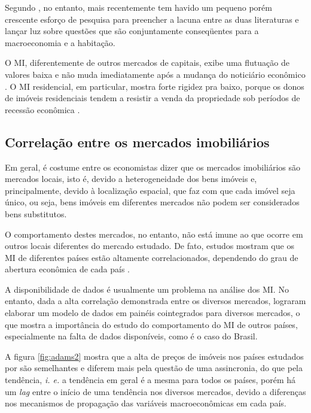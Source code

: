 \documentclass[
	12pt,				%
	oneside,			%
	a4paper,			%
	chapter=TITLE,		%
	section=TITLE,		%
	english,			%
	brazil				%
	]{abntex2}
\begin{document}
\begin{refsection}
Segundo \textcite[p.~4]{LEUNG}, no entanto, mais recentemente tem havido um pequeno porém
crescente esforço de pesquisa para preencher a lacuna entre as duas literaturas
e lançar luz sobre questões que são conjuntamente conseqüentes para a
macroeconomia e a habitação.

O \gls{MI}, diferentemente de outros mercados de capitais, exibe uma flutuação
de valores baixa e não muda imediatamente após a mudança do noticiário econômico
\autocite[3]{ADAMS2010}. O \gls{MI} residencial, em particular, mostra forte rigidez
pra baixo, porque os donos de imóveis residenciais tendem a resistir a venda da
propriedade sob períodos de recessão econômica \autocite[129]{Case2000}.

\hypertarget{correlauxe7uxe3o-entre-os-mercados-imobiliuxe1rios}{%
\subsection{Correlação entre os mercados imobiliários}\label{correlauxe7uxe3o-entre-os-mercados-imobiliuxe1rios}}

Em geral, é costume entre os economistas dizer que os mercados imobiliários são
mercados locais, isto é, devido a heterogeneidade dos bens imóveis e,
principalmente, devido à localização espacial, que faz com que cada imóvel seja
único, ou seja, bens imóveis em diferentes mercados não podem ser
considerados bens substitutos.

O comportamento destes mercados, no entanto, não está imune ao que ocorre em
outros locais diferentes do mercado estudado. De fato, estudos mostram que os
\gls{MI} de diferentes países estão altamente correlacionados, dependendo do
grau de abertura econômica de cada país \autocite{Case2000,ADAMS2010}.

A disponibilidade de dados é usualmente um problema na análise dos \gls{MI}. No
entanto, dada a alta correlação demonstrada entre os diversos mercados,
\textcite{ADAMS2010} lograram elaborar um modelo de dados em painéis cointegrados
para diversos mercados, o que mostra a importância do estudo do comportamento do
\gls{MI} de outros países, especialmente na falta de dados disponíveis, como é
o caso do Brasil.

A figura \ref{fig:adams2} mostra que a alta de preços de imóveis nos países
estudados por \textcite{ADAMS2010} são semelhantes e diferem mais pela questão de uma
assincronia, do que pela tendência, \emph{i. e.} a tendência em geral é a mesma para
todos os países, porém há um \emph{lag} entre o início de uma tendência nos diversos
mercados, devido a diferenças nos mecanismos de propagação das variáveis
macroeconômicas em cada país.
\begin{figure}[H]


\end{figure}
\end{refsection}
\end{document}
